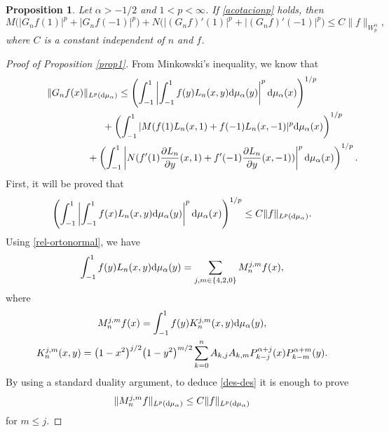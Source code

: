 \documentclass[11pt]{article}
\newtheorem{propo}[thm]{Proposition}
\numberwithin{equation}{section}
\begin{document}
\begin{propo}\label{prop2} Let $\alpha>-1/2$ and $1<p<\infty$. If \eqref{acotacionp} holds, then
	\begin{equation*}
M\big(|G_nf(1)|^p+|G_nf(-1)|^p\big)+N\big(|(G_nf)'(1)|^p+|(G_nf)'(-1)|^p\big)\le C\|f\|_{W_p^{\alpha}},
	\end{equation*}
where $C$ is a constant independent of $n$ and $f$.
\end{propo}

\begin{proof}[Proof of Proposition \ref{prop1}] From Minkowski's inequality, we know that
	\begin{gather*}
	\|G_nf(x)\|_{L^p({\rm d}\mu_{\alpha})}\le
	\left(\int_{-1}^{1}\left|\int_{-1}^{1}f(y)L_n(x,y) {\rm d}{\mu_{\alpha}}(y)\right|^p {\rm d}\mu_{\alpha}(x)\right)^{1/p}\\
\hphantom{\|G_nf(x)\|_{L^p({\rm d}\mu_{\alpha})}\le}{}	+\left(\int_{-1}^{1}|M(f(1)L_n(x,1)+f(-1)L_n(x,-1)|^p {\rm d}\mu_{\alpha}(x)\right)^{1/p}\\
\hphantom{\|G_nf(x)\|_{L^p({\rm d}\mu_{\alpha})}\le}{}	+\left(\int_{-1}^{1}\left|N(f'(1)\frac{\partial L_n}{\partial y}(x,1)+f'(-1)\frac{\partial L_n}{\partial y}(x,-1))\right|^p {\rm d}\mu_{\alpha}(x)\right)^{1/p}.
	\end{gather*}	
First, it will be proved that
\begin{gather}\label{des-des}
\left(\int_{-1}^{1}\left|\int_{-1}^{1}f(x)L_n(x,y) {\rm d}\mu_{\alpha}(y)\right|^p {\rm d}\mu_{\alpha}(x)\right)^{1/p}\le C\|f\|_{L^p({\rm d}\mu_{\alpha})}.
	\end{gather}
Using \eqref{rel-ortonormal}, we have
	\begin{gather*}
	\int_{-1}^{1}f(y)L_n(x,y) {\rm d}\mu_{\alpha}(y)=\sum_{j,m\in \{4,2,0\}}M_n^{j,m}f(x),
	\end{gather*}
where
\begin{gather*}
M_n^{j,m}f(x)=\int_{-1}^{1} f(y) K_n^{j,m}(x,y) {\rm d}\mu_\alpha(y),\\
K_n^{j,m}(x,y)=\big(1-x^2\big)^{j/2}\big(1-y^2\big)^{m/2}\sum_{k=0}^{n}A_{k,j}A_{k,m}P_{k-j}^{\alpha+j}(x)P_{k-m}^{\alpha+m}(y).
\end{gather*}
By using a standard duality argument, to deduce \eqref{des-des} it is enough to prove
\begin{gather*}
\|M_n^{j,m}f\|_{L^p({\rm d}\mu_{\alpha})}\le C\|f\|_{L^p({\rm d}\mu_{\alpha})}
\end{gather*}
for $m\le j$.


\end{proof}
\end{document}
